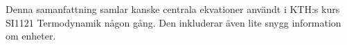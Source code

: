 Denna samanfattning samlar kanske centrala ekvationer användt i KTH:s kurs SI1121 Termodynamik någon gång. Den inkluderar även lite snygg information om enheter.
